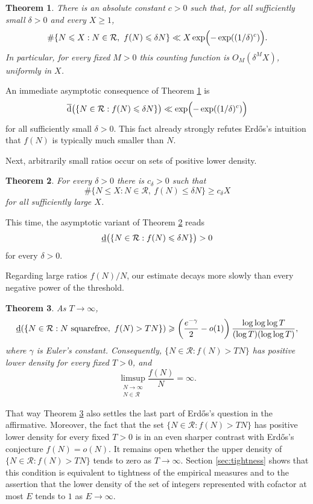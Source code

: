 \documentclass[11pt,letterpaper,reqno]{amsart}
\numberwithin{equation}{section}
\newtheorem{theorem}{Theorem}[section]
\theoremstyle{remark}
\newcommand{\N}{\mathbb{N}}
\newcommand{\Rcal}{\mathcal{R}}
\newcommand{\lowerdens}{\underline{\textup{d}}}
\newcommand{\upperdens}{\overline{\textup{d}}}
\renewcommand{\leq}{\leqslant}
\renewcommand{\geq}{\geqslant}
\begin{document}
\begin{theorem}
\label{thm:small-upper}
There is an absolute constant $c>0$ such that, for all sufficiently small
$\delta>0$ and every $X\geq1$,
\[
 \#\{N\leq X:N\in\Rcal,\ f(N)\leq\delta N\}
 \ll X\exp\Bigl(-\exp((1/\delta)^c)\Bigr).
\]
In particular, for every fixed $M>0$ this counting function is
$O_M(\delta^MX)$, uniformly in $X$.
\end{theorem}

An immediate asymptotic consequence of Theorem \ref{thm:small-upper} is
\[ \upperdens\big(\{N\in\Rcal : f(N)\leq\delta N\}\big) \ll \exp\Bigl(-\exp((1/\delta)^c)\Bigr) \]
for all sufficiently small $\delta>0$.
This fact already strongly refutes Erd\H{o}s's intuition that $f(N)$ is typically much smaller than $N$.

Next, arbitrarily small ratios occur on sets of positive lower density.

\begin{theorem}
\label{thm:small-values}
For every $\delta>0$ there is $c_\delta>0$ such that
\[
 \#\{N\leq X:N\in\Rcal,\ f(N)\leq\delta N\}
 \geq c_\delta X
\]
for all sufficiently large $X$.
\end{theorem}

This time, the asymptotic variant of Theorem \ref{thm:small-values} reads
\[ \lowerdens\big(\{N\in\Rcal : f(N)\leq\delta N\}\big) > 0 \]
for every $\delta>0$.

Regarding large ratios $f(N)/N$, our estimate decays more slowly than every
negative power of the threshold.

\begin{theorem}
\label{thm:almost-log-tail}
As $T\to\infty$,
\begin{equation}\label{eq:almost-log-tail}
 \lowerdens(\{N\in\Rcal:N\text{ squarefree},\ f(N)>TN\})
 \geq\left(\frac{e^{-\gamma}}2-o(1)\right)
 \frac{\log\log\log T}{(\log T)(\log\log T)},
\end{equation}
where $\gamma$ is Euler's constant.
Consequently, $\{N\in\Rcal:f(N)>TN\}$ has positive lower density
for every fixed $T>0$, and
\[
 \limsup_{\substack{N\to\infty\\N\in\Rcal}}\frac{f(N)}N=\infty.
\]
\end{theorem}

That way Theorem \ref{thm:almost-log-tail} also settles the last part of Erd\H{o}s's question in the affirmative.
Moreover, the fact that the set $\{N\in\Rcal:f(N)>TN\}$ has positive lower density for every fixed $T>0$ is in an even sharper contrast with Erd\H{o}s's conjecture $f(N)=o(N)$. It remains open whether the upper density of $\{N\in\Rcal:f(N)>TN\}$ tends to zero as $T\to\infty$.
Section \ref{sec:tightness} shows that this condition is equivalent to tightness of the empirical measures and to the assertion that the lower density of the set of integers represented with cofactor at most $E$ tends to $1$ as $E\to\infty$.
\end{document}

